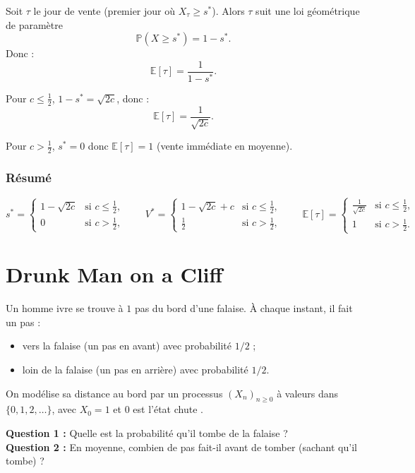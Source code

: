 Soit $\tau$ le jour de vente (premier jour où $X_\tau\ge s^*$).
Alors $\tau$ suit une loi géométrique de paramètre
\[
\mathbb{P}(X\ge s^*)=1-s^*.
\]
Donc :
\[
\mathbb{E}[\tau]=\frac{1}{1-s^*}.
\]

Pour $c\le \frac12$, $1-s^*=\sqrt{2c}$, donc :
\[
\boxed{\mathbb{E}[\tau]=\frac{1}{\sqrt{2c}}.}
\]

Pour $c>\frac12$, $s^*=0$ donc $\mathbb{E}[\tau]=1$ (vente immédiate en moyenne).

\subsubsection*{Résumé}

\[
\boxed{
s^*=
\begin{cases}
1-\sqrt{2c} & \text{si } c\le \frac12,\\
0 & \text{si } c>\frac12,
\end{cases}
\qquad
V^*=
\begin{cases}
1-\sqrt{2c}+c & \text{si } c\le \frac12,\\
\frac12 & \text{si } c>\frac12,
\end{cases}
\qquad
\mathbb{E}[\tau]=
\begin{cases}
\frac{1}{\sqrt{2c}} & \text{si } c\le \frac12,\\
1 & \text{si } c>\frac12.
\end{cases}
}
\]

\section{Drunk Man on a Cliff}

\begin{exerciseBox}
Un homme ivre se trouve à $1$ pas du bord d'une falaise. À chaque instant, il fait un pas :
\begin{itemize}
\item vers la falaise (un pas en avant) avec probabilité $1/2$ ;
\item loin de la falaise (un pas en arrière) avec probabilité $1/2$.
\end{itemize}

On modélise sa distance au bord par un processus $(X_n)_{n\ge 0}$ à valeurs dans $\{0,1,2,\dots\}$, avec $X_0=1$ et $0$ est l'état \og chute \fg.

\textbf{Question 1 :} Quelle est la probabilité qu'il tombe de la falaise ?\\
\textbf{Question 2 :} En moyenne, combien de pas fait-il avant de tomber (sachant qu'il tombe) ?
\end{exerciseBox}

